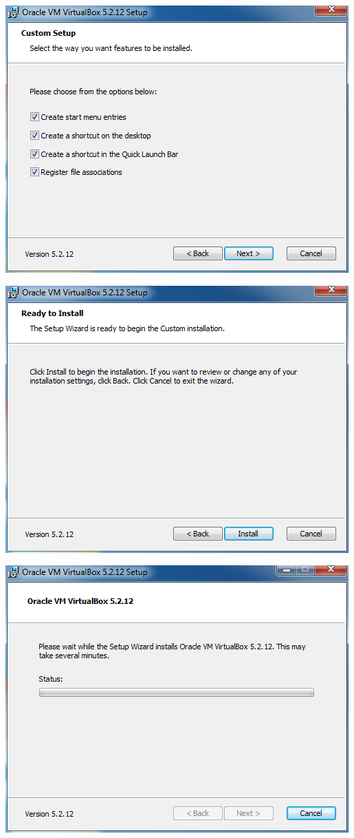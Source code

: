 \begin{center}
		\includegraphics[width=\linewidth]{Trabajo/Anexo01/oracleVirtualBox04.png}

		\includegraphics[width=\linewidth]{Trabajo/Anexo01/oracleVirtualBox05.png}

		\includegraphics[width=\linewidth]{Trabajo/Anexo01/oracleVirtualBox06.png}


\end{center}

